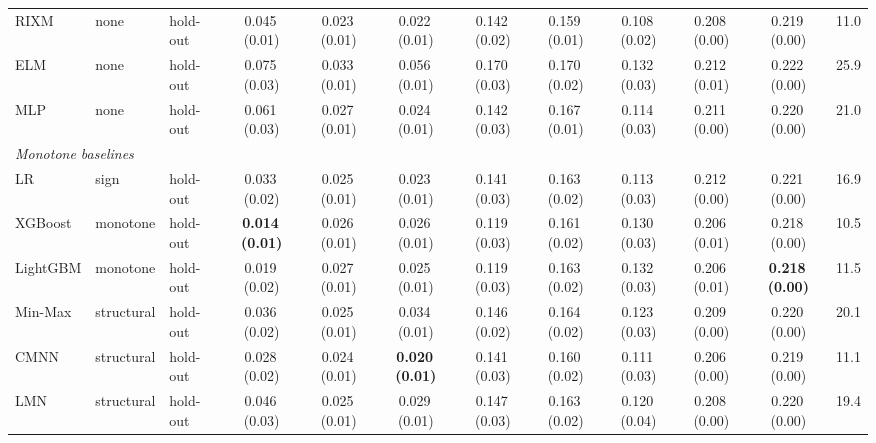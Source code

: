 \begin{table}[!tbp]
{\begin{tabular}{lllccccccccc}
RIXM & none & hold-out & 0.045\,{\scriptsize(0.01)} & 0.023\,{\scriptsize(0.01)} & 0.022\,{\scriptsize(0.01)} & 0.142\,{\scriptsize(0.02)} & 0.159\,{\scriptsize(0.01)} & 0.108\,{\scriptsize(0.02)} & 0.208\,{\scriptsize(0.00)} & 0.219\,{\scriptsize(0.00)} & 11.0 \\
ELM & none & hold-out & 0.075\,{\scriptsize(0.03)} & 0.033\,{\scriptsize(0.01)} & 0.056\,{\scriptsize(0.01)} & 0.170\,{\scriptsize(0.03)} & 0.170\,{\scriptsize(0.02)} & 0.132\,{\scriptsize(0.03)} & 0.212\,{\scriptsize(0.01)} & 0.222\,{\scriptsize(0.00)} & 25.9 \\
MLP & none & hold-out & 0.061\,{\scriptsize(0.03)} & 0.027\,{\scriptsize(0.01)} & 0.024\,{\scriptsize(0.01)} & 0.142\,{\scriptsize(0.03)} & 0.167\,{\scriptsize(0.01)} & 0.114\,{\scriptsize(0.03)} & 0.211\,{\scriptsize(0.00)} & 0.220\,{\scriptsize(0.00)} & 21.0 \\
\midrule
\multicolumn{12}{l}{\textit{Monotone baselines}} \\
LR & sign & hold-out & 0.033\,{\scriptsize(0.02)} & 0.025\,{\scriptsize(0.01)} & 0.023\,{\scriptsize(0.01)} & 0.141\,{\scriptsize(0.03)} & 0.163\,{\scriptsize(0.02)} & 0.113\,{\scriptsize(0.03)} & 0.212\,{\scriptsize(0.00)} & 0.221\,{\scriptsize(0.00)} & 16.9 \\
XGBoost & monotone & hold-out & \textbf{0.014\,{\scriptsize(0.01)}} & 0.026\,{\scriptsize(0.01)} & 0.026\,{\scriptsize(0.01)} & 0.119\,{\scriptsize(0.03)} & 0.161\,{\scriptsize(0.02)} & 0.130\,{\scriptsize(0.03)} & 0.206\,{\scriptsize(0.01)} & 0.218\,{\scriptsize(0.00)} & 10.5 \\
LightGBM & monotone & hold-out & 0.019\,{\scriptsize(0.02)} & 0.027\,{\scriptsize(0.01)} & 0.025\,{\scriptsize(0.01)} & 0.119\,{\scriptsize(0.03)} & 0.163\,{\scriptsize(0.02)} & 0.132\,{\scriptsize(0.03)} & 0.206\,{\scriptsize(0.01)} & \textbf{0.218\,{\scriptsize(0.00)}} & 11.5 \\
Min-Max & structural & hold-out & 0.036\,{\scriptsize(0.02)} & 0.025\,{\scriptsize(0.01)} & 0.034\,{\scriptsize(0.01)} & 0.146\,{\scriptsize(0.02)} & 0.164\,{\scriptsize(0.02)} & 0.123\,{\scriptsize(0.03)} & 0.209\,{\scriptsize(0.00)} & 0.220\,{\scriptsize(0.00)} & 20.1 \\
CMNN & structural & hold-out & 0.028\,{\scriptsize(0.02)} & 0.024\,{\scriptsize(0.01)} & \textbf{0.020\,{\scriptsize(0.01)}} & 0.141\,{\scriptsize(0.03)} & 0.160\,{\scriptsize(0.02)} & 0.111\,{\scriptsize(0.03)} & 0.206\,{\scriptsize(0.00)} & 0.219\,{\scriptsize(0.00)} & 11.1 \\
LMN & structural & hold-out & 0.046\,{\scriptsize(0.03)} & 0.025\,{\scriptsize(0.01)} & 0.029\,{\scriptsize(0.01)} & 0.147\,{\scriptsize(0.03)} & 0.163\,{\scriptsize(0.02)} & 0.120\,{\scriptsize(0.04)} & 0.208\,{\scriptsize(0.00)} & 0.220\,{\scriptsize(0.00)} & 19.4 \\

\end{tabular}}
\end{table}
